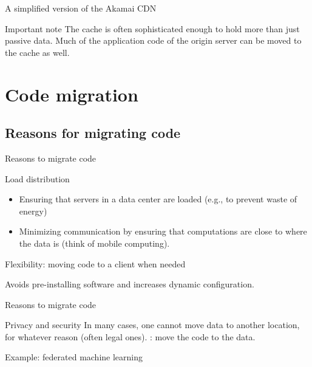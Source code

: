 \begin{slide}{A simplified version of the Akamai CDN}
  \begin{centerfig}
  \end{centerfig}
  \begin{alertblock}{Important note}
    The cache is often sophisticated enough to hold more than just passive data. Much of the application code
    of the origin server can be moved to the cache as well.
  \end{alertblock}
\end{slide}
\section{Code migration}
\subsection{Reasons for migrating code}
\begin{slide}{Reasons to migrate code}
  \begin{block}{Load distribution}
    \begin{itemize}\firmlist
    \item Ensuring that servers in a data center are  loaded (e.g., to prevent waste of
      energy)
    \item Minimizing communication by ensuring that computations are close to where the data is (think of
      mobile computing).
    \end{itemize}
  \end{block}

  \begin{block}{Flexibility: moving code to a client when needed}
    \begin{centerfig}
    \end{centerfig}
    Avoids pre-installing software and increases dynamic configuration.
  \end{block}
\end{slide}
\begin{slide}{Reasons to migrate code}
  \begin{block}{Privacy and security}
    In many cases, one cannot move data to another location, for whatever reason (often legal
    ones). : move the code to the data.
  \end{block}
  \begin{block}{Example: federated machine learning}
    \begin{centerfig}
    \end{centerfig}
  \end{block}
\end{slide}
